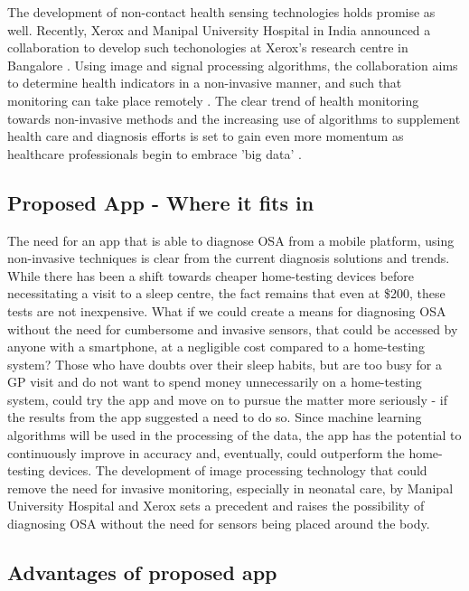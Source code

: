The development of non-contact health sensing technologies holds promise as well. Recently, Xerox and Manipal University Hospital in India announced a collaboration to develop such techonologies at Xerox's research centre in Bangalore \cite{xerox1, xerox2}. Using image and signal processing algorithms, the collaboration aims to determine health indicators in a non-invasive manner, and such that monitoring can take place remotely \cite{xerox1}. The clear trend of health monitoring towards non-invasive methods and the increasing use of algorithms to supplement health care and diagnosis efforts is set to gain even more momentum as healthcare professionals begin to embrace 'big data' \cite{bigdata}.

\subsection{Proposed App - Where it fits in}

The need for an app that is able to diagnose OSA from a mobile platform, using non-invasive techniques is clear from the current diagnosis solutions and trends. While there has been a shift towards cheaper home-testing devices before necessitating a visit to a sleep centre, the fact remains that even at \$200, these tests are not inexpensive. What if we could create a means for diagnosing OSA without the need for cumbersome and invasive sensors, that could be accessed by anyone with a smartphone, at a negligible cost compared to a home-testing system? Those who have doubts over their sleep habits, but are too busy for a GP visit and do not want to spend money unnecessarily on a home-testing system, could try the app and move on to pursue the matter more seriously - if the results from the app suggested a need to do so. Since machine learning algorithms will be used in the processing of the data, the app has the potential to continuously improve in accuracy and, eventually, could outperform the home-testing devices. The development of image processing technology that could remove the need for invasive monitoring, especially in neonatal care, by Manipal University Hospital and Xerox sets a precedent and raises the possibility of diagnosing OSA without the need for sensors being placed around the body.


\subsection{Advantages of proposed app}

